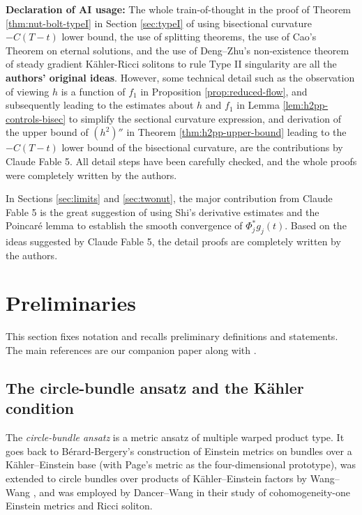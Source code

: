 \documentclass[11pt]{amsart}
\theoremstyle{plain}
\numberwithin{equation}{section}
\theoremstyle{definition}
\theoremstyle{remark}
\begin{document}
\medskip

\noindent\textbf{Declaration of AI usage:} The whole train-of-thought in the proof of Theorem \ref{thm:nut-bolt-typeI} in Section \ref{sec:typeI} of using bisectional curvature $-C(T-t)$ lower bound, the use of splitting theorems, the use of Cao's Theorem on eternal solutions, and the use of Deng--Zhu's non-existence theorem of steady gradient K\"ahler-Ricci solitons to rule Type II singularity are all the \textbf{authors' original ideas}. However, some technical detail such as the observation of viewing $h$ is a function of $f_1$ in Proposition \ref{prop:reduced-flow}, and subsequently leading to the estimates about $h$ and $f_1$ in Lemma \ref{lem:h2pp-controls-bisec} to simplify the sectional curvature expression, and derivation of the upper bound of $(h^2)''$ in Theorem \ref{thm:h2pp-upper-bound} leading to the $-C(T-t)$ lower bound of the bisectional curvature, are the contributions by Claude Fable 5. All detail steps have been carefully checked, and the whole proofs were completely written by the authors.

In Sections \ref{sec:limits} and \ref{sec:twonut}, the major contribution from Claude Fable 5 is the great suggestion of using Shi's derivative estimates and the Poincar\'e lemma to establish the smooth convergence of $\Phi_j^*g_j(t)$. Based on the ideas suggested by Claude Fable 5, the detail proofs are completely written by the authors.

\section{Preliminaries}\label{sec:prelim}

This section fixes notation and recalls preliminary definitions and statements. The main references are our companion paper \cite{FT} along with \cite{DW1998, DW2011, VZ}.

\subsection{The circle-bundle ansatz and the K\"{a}hler condition}\label{subsec:ansatz}

The \emph{circle-bundle ansatz} is a metric ansatz of {multiple warped product} type. It goes back to Bérard-Bergery's construction \cite{BB} of Einstein metrics on bundles over a Kähler--Einstein base (with Page's metric \cite{Page} as the four-dimensional prototype), was extended to circle bundles over products of Kähler--Einstein factors by Wang--Wang \cite{WW}, and was employed by Dancer--Wang \cite{DW1998,DW2011} in their study of cohomogeneity-one Einstein metrics and Ricci soliton. %
\end{document}
